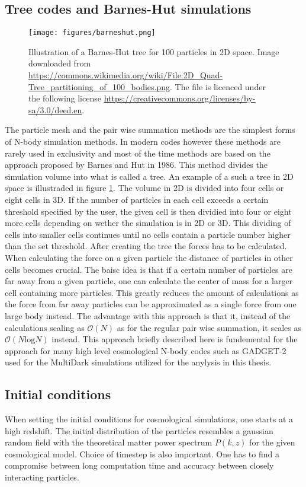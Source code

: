 \subsection{Tree codes and Barnes-Hut simulations}\label{sec:barneshut}
\begin{figure}
    \label{fig:barneshut}
    \texttt{[image: figures/barneshut.png]}
    \caption{Illustration of a Barnes-Hut tree for 100 particles in 2D space. Image downloaded from \url{https://commons.wikimedia.org/wiki/File:2D_Quad-Tree_partitioning_of_100_bodies.png}.
    The file is licenced under the following license \url{https://creativecommons.org/licenses/by-sa/3.0/deed.en}.}
\end{figure}
The particle mesh and the pair wise summation methods are the simplest forms of N-body simulation methods.
In modern codes however these methods are rarely used in exclusivity and most of the time methods are based on the approach proposed
by Barnes and Hut in 1986\cite{Barneshut}. This method divides the simulation volume into what is called a tree. An example of a such a tree in 2D space is 
illustraded in figure \ref{fig:barneshut}. The volume in 2D is divided into four cells or eight cells in 3D. If the number of particles in each cell exceeds a certain
threshold specified by the user, the given cell is then dividied into four or eight more cells depending on wether the simulation is in 2D or 3D. This dividing of cells
into smaller cells continues until no cells contain a particle number higher than the set threshold. After creating the tree the forces has to be calculated. When calculating
the force on a given particle the distance of particles in other cells becomes crucial. The baisc idea is that if a certain number of particles are far away from a given particle,
one can calculate the center of mass for a larger cell containing more particles. This greatly reduces the amount of calculations as the force from far away particles can be approximated
as a single force from one large body instead. The advantage with this approach is that it, instead of the calculations scaling as $\mathcal{O}(N)$ as for the regular pair wise summation,
it scales as $\mathcal{O}(N\mathrm{log}N)$ instead. This approach briefly described here is fundemental for the approach for many high level cosmological N-body codes such as GADGET-2\cite{springel2005}
used for the MultiDark simulations utilized for the anylysis in this thesis.
\subsection{Initial conditions}
When setting the initial conditions for cosmological simulations, one starts at
a high redshift. The initial distribution of the particles resembles a gaussian
random field with the theoretical matter power spectrum $P(k,z)$ for the given
cosmological model. Choice of timestep is also important. One has to find a
compromise between long computation time and accuracy between closely
interacting particles. 

